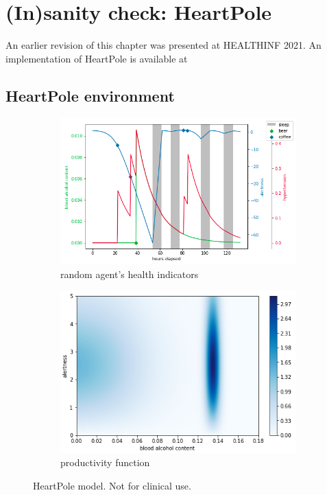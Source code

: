 \chapter{(In)sanity check: HeartPole}
\label{ch:heartpole}

\begin{remark}
    An earlier revision \cite{heartpole} of this chapter was presented at HEALTHINF 2021. An implementation of HeartPole is available at \cite{liventsevVadim0x60Heartpole2024} 
\end{remark}


\section{HeartPole environment}
\label{sec:heartpole-methodology}

\begin{figure}
    \begin{subfigure}{0.52\linewidth}
      \includegraphics[width=\linewidth]{images/heartpole_example.png}
      \caption{random agent's health indicators}
      \label{fig:random}
    \end{subfigure}
    \begin{subfigure}{0.48\linewidth}
      \includegraphics[width=\linewidth]{images/productivity.png}
      \caption{productivity function}
      \label{fig:productivity}
    \end{subfigure}
    \caption{HeartPole model. Not for clinical use.}
\end{figure}

